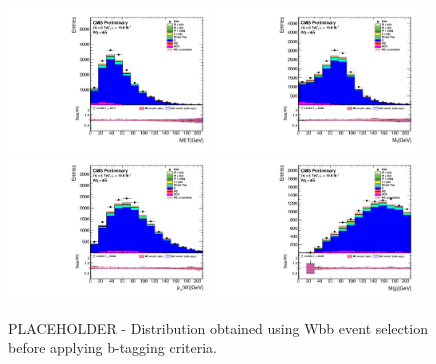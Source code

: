 \begin{figure}[htbp]
	\centering
		\includegraphics[width=0.48\textwidth]{Figures/Results/Muon/prefit/TT_GetMET_doQCD1.pdf}
		\includegraphics[width=0.48\textwidth]{Figures/Results/Muon/prefit/TT_GetVMt_doQCD1.pdf}
		\includegraphics[width=0.48\textwidth]{Figures/Results/Muon/prefit/TT_GetWpt_doQCD1.pdf}
		\includegraphics[width=0.48\textwidth]{Figures/Results/Muon/prefit/TT_H_mass_doQCD1.pdf}		
	\caption[Distribution obtained using Wbb event selection before applying b-tagging criteria.]{PLACEHOLDER - Distribution obtained using Wbb event selection before applying b-tagging criteria.}
	\label{fig:Wjets}
\end{figure}

